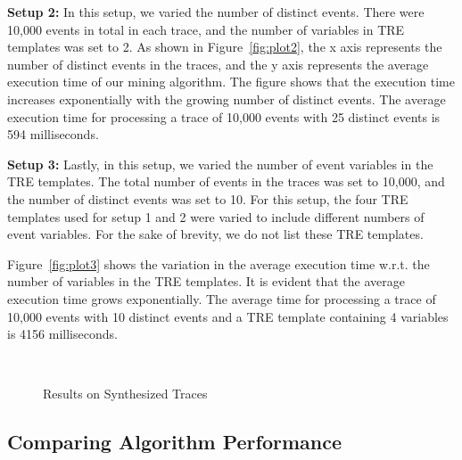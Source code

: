 \documentclass[]{sigplanconf}
\begin{document}
\vspace{3mm}

\noindent \textbf{Setup 2:}
In this setup, we varied the number of distinct events. There were 10,000 events in total in each trace, and the number of variables in TRE templates was set to 2. As shown in Figure~\ref{fig:plot2}, the x axis represents the number of distinct events in the traces, and the y axis represents the average execution time of our mining algorithm. The figure shows that the execution time increases exponentially with the growing number of distinct events. The average execution time for processing a trace of 10,000 events with 25 distinct events is 594 milliseconds.

\vspace{3mm}

\noindent \textbf{Setup 3:}
Lastly, in this setup, we varied the number of event variables in the TRE templates. The total number of events in the traces was set to 10,000, and the number of distinct events was set to 10. For this setup, the four TRE templates used for setup 1 and 2 were varied to include different numbers of event variables. For the sake of brevity, we do not list these TRE templates.

Figure~\ref{fig:plot3} shows the variation in the average execution time w.r.t. the number of variables in the TRE templates.
It is evident that the average execution time grows exponentially. The average time for processing a trace of 10,000 events with 10 distinct events and a TRE template containing 4 variables is 4156 milliseconds.

\begin{figure}[ht]
  \centering
  \\
  \caption{Results on Synthesized Traces}\label{Algs_synth}
\end{figure}

\subsection{Comparing Algorithm Performance}
\end{document}
